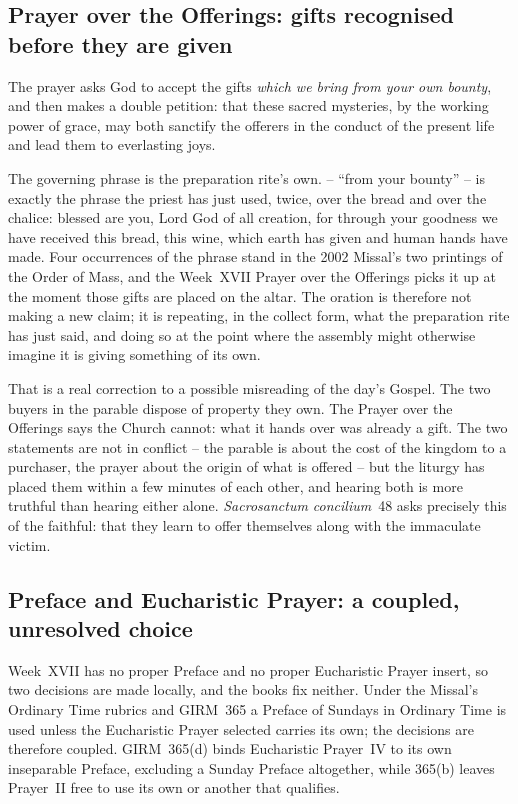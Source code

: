 \subsection*{Prayer over the Offerings: gifts recognised before they are given}

The prayer asks God to accept the gifts \emph{which we bring from your own bounty}, and then makes a double petition: that these sacred mysteries, by the working power of grace, may both sanctify the offerers in the conduct of the present life and lead them to everlasting joys.

The governing phrase is the preparation rite's own.  -- ``from your bounty'' -- is exactly the phrase the priest has just used, twice, over the bread and over the chalice: blessed are you, Lord God of all creation, for through your goodness we have received this bread, this wine, which earth has given and human hands have made. Four occurrences of the phrase stand in the 2002 Missal's two printings of the Order of Mass, and the Week~XVII Prayer over the Offerings picks it up at the moment those gifts are placed on the altar. The oration is therefore not making a new claim; it is repeating, in the collect form, what the preparation rite has just said, and doing so at the point where the assembly might otherwise imagine it is giving something of its own.

That is a real correction to a possible misreading of the day's Gospel. The two buyers in the parable dispose of property they own. The Prayer over the Offerings says the Church cannot: what it hands over was already a gift. The two statements are not in conflict -- the parable is about the cost of the kingdom to a purchaser, the prayer about the origin of what is offered -- but the liturgy has placed them within a few minutes of each other, and hearing both is more truthful than hearing either alone. \emph{Sacrosanctum concilium}~48 asks precisely this of the faithful: that they learn to offer themselves along with the immaculate victim.

\subsection*{Preface and Eucharistic Prayer: a coupled, unresolved choice}

Week~XVII has no proper Preface and no proper Eucharistic Prayer insert, so two decisions are made locally, and the books fix neither. Under the Missal's Ordinary Time rubrics and GIRM~365 a Preface of Sundays in Ordinary Time is used unless the Eucharistic Prayer selected carries its own; the decisions are therefore coupled. GIRM~365(d) binds Eucharistic Prayer~IV to its own inseparable Preface, excluding a Sunday Preface altogether, while 365(b) leaves Prayer~II free to use its own or another that qualifies.

